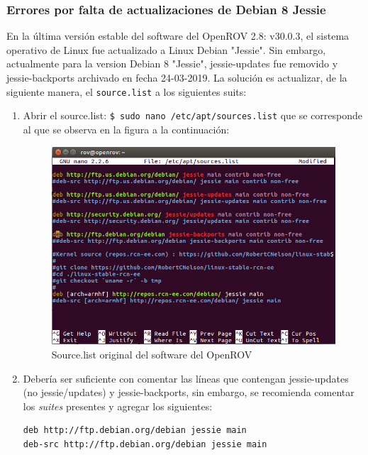 \subsubsection{Errores por falta de actualizaciones de Debian 8 Jessie} 

En la última versión estable del software del OpenROV 2.8: v30.0.3, el sistema operativo de Linux fue actualizado a Linux Debian "Jessie". Sin embargo, actualmente para la version Debian 8 "Jessie", jessie-updates fue removido y jessie-backports archivado en fecha 24-03-2019. La solución es actualizar, de la siguiente manera, el \verb|source.list| a los siguientes suits:

\begin{enumerate}
    \item Abrir el source.list: \verb|$ sudo nano /etc/apt/sources.list| que se corresponde al que se observa en la figura a la continuación:
    
    \begin{figure}[H]
        \centering
        \includegraphics[scale=0.5]{partes/ImgSophia/Apendice/2SourceListOriginal.png}
        \caption{Source.list original del software del OpenROV}
        \label{fig:SourceOriginal}
    \end{figure}
    
    \item Debería ser suficiente con comentar las líneas que contengan jessie-updates (no jessie/updates) y jessie-backports, sin embargo, se recomienda comentar los \textit{suites} presentes y agregar los siguientes: 
    
\footnotesize
\begin{verbatim}
deb http://ftp.debian.org/debian jessie main
deb-src http://ftp.debian.org/debian jessie main


\end{verbatim}
\end{enumerate}

